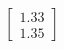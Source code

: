 \documentclass[preview]{standalone}
\begin{document}
\begin{align*}
\begin{bmatrix} 1.33 \\ 1.35 \end{bmatrix}
\end{align*}
\end{document}
